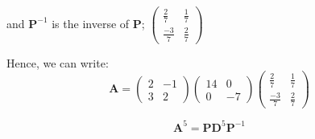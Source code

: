 \documentclass{tufte-handout}
\begin{document}
\begin{question}
and \( \mathbf{P}^{-1} \) is the inverse of \( \mathbf{P} \); 
\(\begin{pmatrix}
  \frac{2}{7} & \frac{1}{7}\\
  \frac{-3}{7} & \frac{2}{7}  
\end{pmatrix}\)

Hence, we can write:
\[ \mathbf{A} = \begin{pmatrix}
  2 & -1\\
  3 & 2 
\end{pmatrix}
\begin{pmatrix}
  14 & 0\\
  0 & -7
\end{pmatrix}
\begin{pmatrix}
  \frac{2}{7} & \frac{1}{7}\\
  \frac{-3}{7} & \frac{2}{7}
\end{pmatrix} \]

\vspace{3cm}

\qpart

\[ \mathbf{A}^5 = \mathbf{P}\mathbf{D}^5\mathbf{P}^{-1} \]


\end{question}
\end{document}
